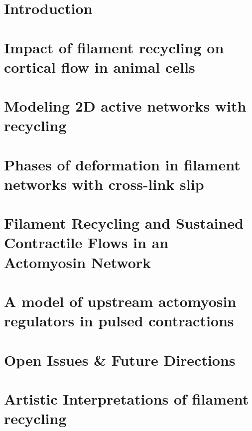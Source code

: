 \documentclass{easychithesis}
\begin{document}
%
%

\tableofcontents

%
% 

\listoffigures

% 
% 

\listoftables

%
%
\mainmatter

%
%
\chapter{Introduction}


\chapter{Impact of filament recycling on cortical flow in animal cells}



\chapter{Modeling 2D active networks with recycling}



\chapter{Phases of deformation in filament networks with cross-link slip}


\chapter{Filament Recycling and Sustained Contractile Flows in an Actomyosin Network}


\chapter{A model of upstream actomyosin regulators in pulsed contractions}


\chapter{Open Issues \& Future Directions}



%
%
\appendix

\chapter{Artistic Interpretations of filament recycling}

\end{document}
